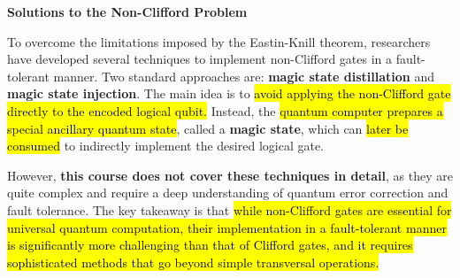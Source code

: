\begin{flushleft}
    \textcolor{Green3}{ \textbf{Solutions to the Non-Clifford Problem}}
\end{flushleft}
To overcome the limitations imposed by the Eastin-Knill theorem, researchers have developed several techniques to implement non-Clifford gates in a fault-tolerant manner. Two standard approaches are: \textbf{magic state distillation} and \textbf{magic state injection}. The main idea is to \hl{avoid applying the non-Clifford gate directly to the encoded logical qubit.} Instead, the \hl{quantum computer prepares a special ancillary quantum state}, called a \textbf{magic state}, which can \hl{later be consumed} to indirectly implement the desired logical gate.

\highspace
However, \textbf{this course does not cover these techniques in detail}, as they are quite complex and require a deep understanding of quantum error correction and fault tolerance. The key takeaway is that \hl{while non-Clifford gates are essential for universal quantum computation, their implementation in a fault-tolerant manner is significantly more challenging than that of Clifford gates, and it requires sophisticated methods that go beyond simple transversal operations.}